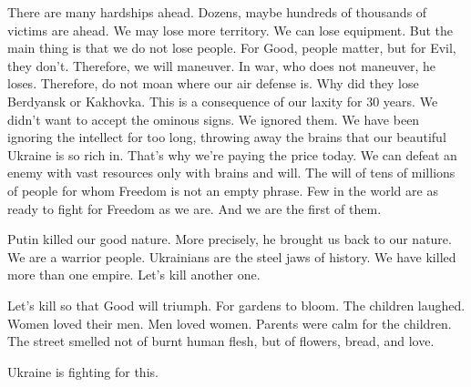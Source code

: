 There are many hardships ahead. Dozens, maybe hundreds of thousands of victims
are ahead. We may lose more territory. We can lose equipment. But the main
thing is that we do not lose people. For Good, people matter, but for Evil,
they don't. Therefore, we will maneuver. In war, who does not maneuver, he
loses. Therefore, do not moan where our air defense is. Why did they lose
Berdyansk or Kakhovka. This is a consequence of our laxity for 30 years. We
didn't want to accept the ominous signs. We ignored them. We have been ignoring
the intellect for too long, throwing away the brains that our beautiful Ukraine
is so rich in. That's why we're paying the price today. We can defeat an enemy
with vast resources only with brains and will. The will of tens of millions of
people for whom Freedom is not an empty phrase. Few in the world are as ready
to fight for Freedom as we are. And we are the first of them.

Putin killed our good nature. More precisely, he brought us back to our nature.
We are a warrior people. Ukrainians are the steel jaws of history. We have
killed more than one empire. Let's kill another one.

Let's kill so that Good will triumph. For gardens to bloom. The children
laughed. Women loved their men. Men loved women. Parents were calm for the
children. The street smelled not of burnt human flesh, but of flowers, bread,
and love.

Ukraine is fighting for this.

